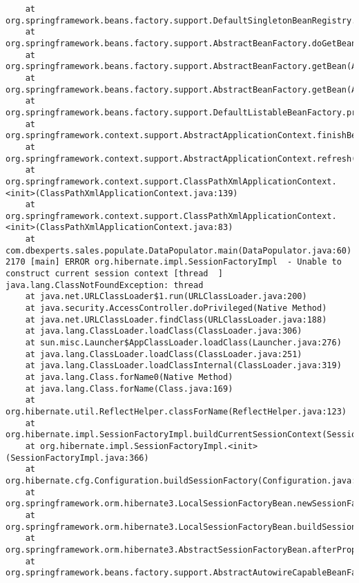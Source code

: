 \begin{verbatim}
	at org.springframework.beans.factory.support.DefaultSingletonBeanRegistry.getSingleton(DefaultSingletonBeanRegistry.java:222)
	at org.springframework.beans.factory.support.AbstractBeanFactory.doGetBean(AbstractBeanFactory.java:261)
	at org.springframework.beans.factory.support.AbstractBeanFactory.getBean(AbstractBeanFactory.java:185)
	at org.springframework.beans.factory.support.AbstractBeanFactory.getBean(AbstractBeanFactory.java:164)
	at org.springframework.beans.factory.support.DefaultListableBeanFactory.preInstantiateSingletons(DefaultListableBeanFactory.java:423)
	at org.springframework.context.support.AbstractApplicationContext.finishBeanFactoryInitialization(AbstractApplicationContext.java:728)
	at org.springframework.context.support.AbstractApplicationContext.refresh(AbstractApplicationContext.java:380)
	at org.springframework.context.support.ClassPathXmlApplicationContext.<init>(ClassPathXmlApplicationContext.java:139)
	at org.springframework.context.support.ClassPathXmlApplicationContext.<init>(ClassPathXmlApplicationContext.java:83)
	at com.dbexperts.sales.populate.DataPopulator.main(DataPopulator.java:60)
2170 [main] ERROR org.hibernate.impl.SessionFactoryImpl  - Unable to construct current session context [thread	]
java.lang.ClassNotFoundException: thread	
	at java.net.URLClassLoader$1.run(URLClassLoader.java:200)
	at java.security.AccessController.doPrivileged(Native Method)
	at java.net.URLClassLoader.findClass(URLClassLoader.java:188)
	at java.lang.ClassLoader.loadClass(ClassLoader.java:306)
	at sun.misc.Launcher$AppClassLoader.loadClass(Launcher.java:276)
	at java.lang.ClassLoader.loadClass(ClassLoader.java:251)
	at java.lang.ClassLoader.loadClassInternal(ClassLoader.java:319)
	at java.lang.Class.forName0(Native Method)
	at java.lang.Class.forName(Class.java:169)
	at org.hibernate.util.ReflectHelper.classForName(ReflectHelper.java:123)
	at org.hibernate.impl.SessionFactoryImpl.buildCurrentSessionContext(SessionFactoryImpl.java:1043)
	at org.hibernate.impl.SessionFactoryImpl.<init>(SessionFactoryImpl.java:366)
	at org.hibernate.cfg.Configuration.buildSessionFactory(Configuration.java:1327)
	at org.springframework.orm.hibernate3.LocalSessionFactoryBean.newSessionFactory(LocalSessionFactoryBean.java:814)
	at org.springframework.orm.hibernate3.LocalSessionFactoryBean.buildSessionFactory(LocalSessionFactoryBean.java:732)
	at org.springframework.orm.hibernate3.AbstractSessionFactoryBean.afterPropertiesSet(AbstractSessionFactoryBean.java:211)
	at org.springframework.beans.factory.support.AbstractAutowireCapableBeanFactory.invokeInitMethods(AbstractAutowireCapableBeanFactory.java:1369)

\end{verbatim}
